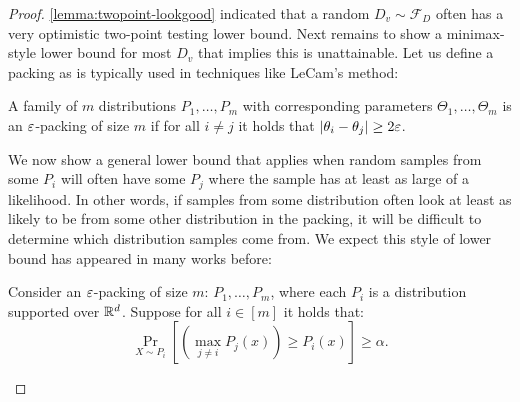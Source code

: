 \begin{proof}
\cref{lemma:twopoint-lookgood} indicated that a random $D_v \sim \mathcal{F}_D$ often has a very optimistic two-point testing lower bound. Next remains to show a minimax-style lower bound for most $D_v$ that implies this is unattainable. Let us define a packing as is typically used in techniques like LeCam's method:

\begin{definition}
    A family of $m$ distributions $P_1,\dots, P_m$ with corresponding parameters $\Theta_1,\dots,\Theta_m$ is an $\varepsilon$-packing of size $m$ if for all $i \ne j$ it holds that $|\theta_i-\theta_j| \ge 2\varepsilon$.
\end{definition}

We now show a general lower bound that applies when random samples from some $P_i$ will often have some $P_j$ where the sample has at least as large of a likelihood. In other words, if samples from some distribution often look at least as likely to be from some other distribution in the packing, it will be difficult to determine which distribution samples come from. We expect this style of lower bound has appeared in many works before:

\begin{lemma}\label{lemma:other-likely}
    Consider an $\varepsilon$-packing of size $m$: $P_1,\dots,P_m$, where each $P_i$ is a distribution supported over $\mathbb{R}^d$. Suppose for all $i \in [m]$ it holds that:
    \begin{equation*}
        \Pr_{X \sim P_i}\left[\left(\max_{j \ne i} P_j(x) \right) \ge P_i(x)\right] \ge \alpha.
    \end{equation*}


\end{lemma}
\end{proof}
